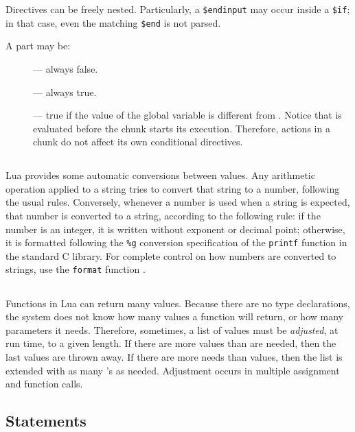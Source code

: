 Directives can be freely nested.
Particularly, a \verb|$endinput| may occur inside a \verb|$if|;
in that case, even the matching \verb|$end| is not parsed.

A  part may be:
\begin{description}
\item[] --- always false.
\item[] --- always true.
\item[] --- true if the value of the
global variable  is different from \nil.
Notice that  is evaluated before the chunk starts its execution.
Therefore, actions in a chunk do not affect its own conditional directives.
\end{description}

\subsection{} \label{coercion}

Lua provides some automatic conversions between values.
Any arithmetic operation applied to a string tries to convert
that string to a number, following the usual rules.
Conversely, whenever a number is used when a string is expected,
that number is converted to a string, according to the following rule:
if the number is an integer, it is written without exponent or decimal point;
otherwise, it is formatted following the \verb|%g|
conversion specification of the \verb|printf| function in the
standard C library.
For complete control on how numbers are converted to strings,
use the \verb|format| function .


\subsection{} \label{adjust}

Functions in Lua can return many values.
Because there are no type declarations,
the system does not know how many values a function will return,
or how many parameters it needs.
Therefore, sometimes, a list of values must be \emph{adjusted}, at run time,
to a given length.
If there are more values than are needed, then the last values are thrown away.
If there are more needs than values, then the list is extended with as
many  \nil's as needed.
Adjustment occurs in multiple assignment and function calls.


\subsection{Statements}

